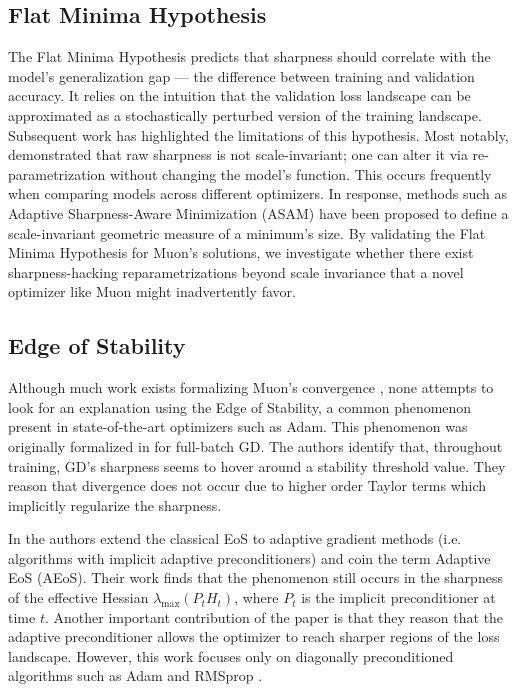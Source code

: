 \documentclass{article}
\theoremstyle{plain}
\theoremstyle{definition}
\theoremstyle{remark}
\begin{document}
\subsection{Flat Minima Hypothesis}

 The Flat Minima Hypothesis \cite{hochreiter1997flat} \cite{keskar2017large} predicts that sharpness should correlate with the model's generalization gap — the difference between training and validation accuracy. It relies on the intuition that the validation loss landscape can be approximated as a stochastically perturbed version of the training landscape. Subsequent work has highlighted the limitations of this hypothesis. Most notably, \citet{dinh2017sharp} demonstrated that raw sharpness is not scale-invariant; one can alter it via re-parametrization without changing the model's function. This occurs frequently when comparing models across different optimizers. In response, methods such as Adaptive Sharpness-Aware Minimization (ASAM) \cite{kwon2021asam} have been proposed to define a scale-invariant geometric measure of a minimum's size. By validating the Flat Minima Hypothesis for Muon's solutions, we investigate whether there exist sharpness-hacking reparametrizations beyond scale invariance that a novel optimizer like Muon might inadvertently favor.

\subsection{Edge of Stability}

Although much work exists formalizing Muon's convergence \cite{shen2025muonconvergence, chen2025muonspectralnorm, sfyraki2025lionsmuons, sato280140878muonconvergencebatch, chang2025muonconvergencebeyond}, none attempts to look for an explanation using the Edge of Stability, a common phenomenon present in state-of-the-art optimizers such as Adam. This phenomenon was originally formalized in \cite{cohen2021gdeos} for full-batch GD. The authors identify that, throughout training, GD's sharpness seems to hover around a stability threshold value. They reason that divergence does not occur due to higher order Taylor terms which implicitly regularize the sharpness.

In \cite{cohen2024adaptivegradientmethodsedge} the authors extend the classical EoS to adaptive gradient methods (i.e. algorithms with implicit adaptive preconditioners) and coin the term Adaptive EoS (AEoS). Their work finds that the phenomenon still occurs in the sharpness of the effective Hessian $\lambda_\text{max}(P_tH_t)$, where $P_t$ is the implicit preconditioner at time $t$. Another important contribution of the paper is that they reason that the adaptive preconditioner allows the optimizer to reach sharper regions of the loss landscape. However, this work focuses only on diagonally preconditioned algorithms such as Adam and RMSprop \cite{tieleman2017divide}. 
\end{document}
